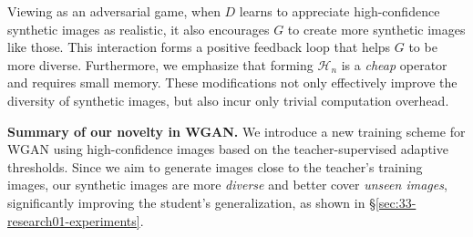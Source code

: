 \documentclass[12pt, a4paper, twoside]{book}
\numberwithin{equation}{chapter}
\theoremstyle{plain}
\theoremstyle{definition}
\theoremstyle{remark}
\newenvironment{foldable}{}{}
\begin{document}
\begin{foldable}
  Viewing as an adversarial game, when $D$ learns to appreciate high-confidence synthetic images as realistic, it also encourages $G$ to create more synthetic images like those.
  This interaction forms a positive feedback loop that helps $G$ to be more diverse.
  Furthermore, we emphasize that forming $\mathcal{H}_{n}$ is a \textit{cheap} operator and requires small memory.
  These modifications not only effectively improve the diversity of synthetic images, but also incur only trivial computation overhead.
\end{foldable}

\begin{foldable}
  \textbf{Summary of our novelty in WGAN.}
  We introduce a new training scheme for WGAN using high-confidence images based on the teacher-supervised adaptive thresholds.
  Since we aim to generate images close to the teacher's training images, our synthetic images are more \textit{diverse} and better cover \textit{unseen images}, significantly improving the student's generalization, as shown in \S\ref{sec:33-research01-experiments}.
\end{foldable}
\end{document}
